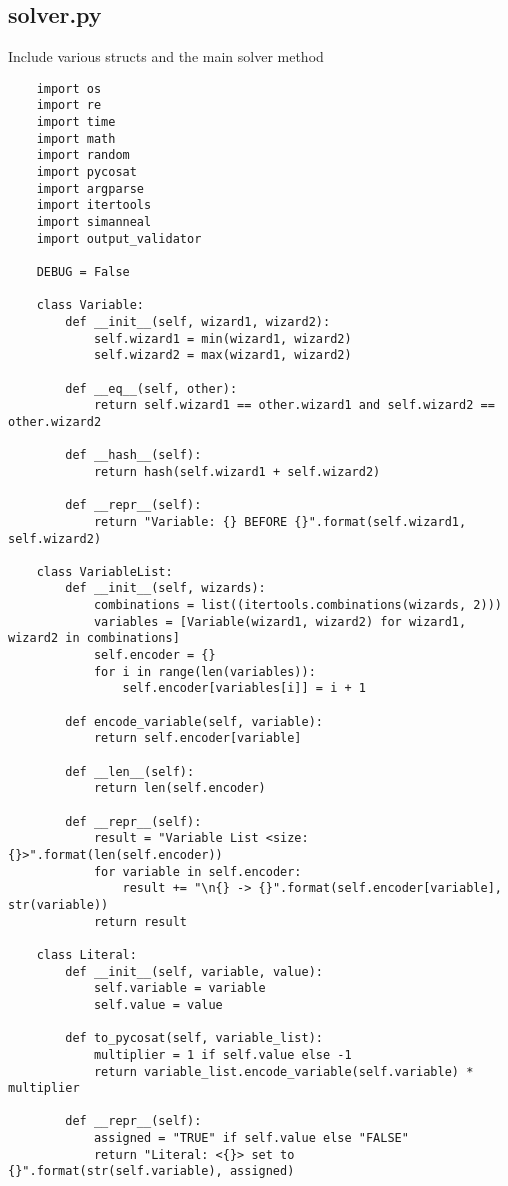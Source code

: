 \documentclass{article}
\theoremstyle{plain}
\numberwithin{theorem}{subsection}
\theoremstyle{definition}
\numberwithin{equation}{subsection}
\begin{document}
\subsection{solver.py}
Include various structs and the main solver method
\begin{lstlisting}
    import os
    import re
    import time
    import math
    import random
    import pycosat
    import argparse
    import itertools
    import simanneal
    import output_validator
    
    DEBUG = False
    
    class Variable:
        def __init__(self, wizard1, wizard2):
            self.wizard1 = min(wizard1, wizard2)
            self.wizard2 = max(wizard1, wizard2)
        
        def __eq__(self, other):
            return self.wizard1 == other.wizard1 and self.wizard2 == other.wizard2
    
        def __hash__(self):
            return hash(self.wizard1 + self.wizard2)
        
        def __repr__(self):
            return "Variable: {} BEFORE {}".format(self.wizard1, self.wizard2)
    
    class VariableList:
        def __init__(self, wizards):
            combinations = list((itertools.combinations(wizards, 2)))
            variables = [Variable(wizard1, wizard2) for wizard1, wizard2 in combinations]
            self.encoder = {}
            for i in range(len(variables)):
                self.encoder[variables[i]] = i + 1
            
        def encode_variable(self, variable):
            return self.encoder[variable]
        
        def __len__(self):
            return len(self.encoder)
    
        def __repr__(self):
            result = "Variable List <size: {}>".format(len(self.encoder))
            for variable in self.encoder:
                result += "\n{} -> {}".format(self.encoder[variable], str(variable))
            return result
    
    class Literal:
        def __init__(self, variable, value):
            self.variable = variable
            self.value = value
        
        def to_pycosat(self, variable_list):
            multiplier = 1 if self.value else -1
            return variable_list.encode_variable(self.variable) * multiplier
        
        def __repr__(self):
            assigned = "TRUE" if self.value else "FALSE"
            return "Literal: <{}> set to {}".format(str(self.variable), assigned)
    

\end{lstlisting}
\end{document}
